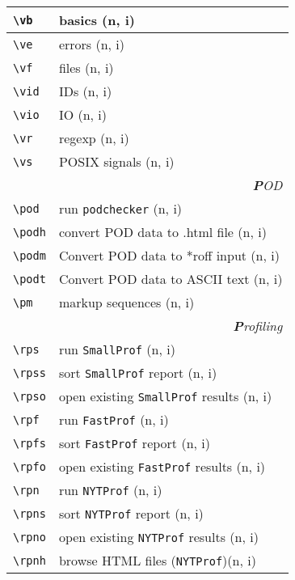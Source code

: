 \documentclass[oneside,10pt,landscape,DIV17]{scrartcl}
\begin{document}
\begin{multicols}{3}
\begin{center}
\begin{tabular}[]{|p{11mm}|p{60mm}|}
\hline \verb'\vb'   & basics \hfill (n, i)\\
\hline \verb'\ve'   & errors \hfill (n, i)\\
\hline \verb'\vf'   & files  \hfill (n, i)\\
\hline \verb'\vid'  & IDs    \hfill (n, i)\\
\hline \verb'\vio'  & IO     \hfill (n, i)\\
\hline \verb'\vr'   & regexp \hfill (n, i)\\
\hline \verb'\vs'   & POSIX signals \hfill (n, i)\\
\hline
\hline
\multicolumn{2}{|r|}{\textsl{\textbf{P}OD}}                       \\[1.0ex]
\hline \verb'\pod'    & run \verb'podchecker'           \hfill (n, i)\\
\hline \verb'\podh'   & convert POD data to .html file  \hfill (n, i)\\
\hline \verb'\podm'   & Convert POD data to *roff input \hfill (n, i)\\
\hline \verb'\podt'   & Convert POD data to ASCII text  \hfill (n, i)\\
\hline \verb'\pm'     & markup sequences                \hfill (n, i)\\
\hline
\hline
\multicolumn{2}{|r|}{\textsl{\textbf{P}rofiling}}                 \\[1.0ex]
\hline \verb'\rps'     & run \verb'SmallProf'                    \hfill (n, i)\\
\hline \verb'\rpss'    & sort \verb'SmallProf' report            \hfill (n, i)\\
\hline \verb'\rpso'    & open existing \verb'SmallProf' results  \hfill (n, i)\\
\hline
%
\hline \verb'\rpf'     & run \verb'FastProf'                    \hfill (n, i)\\
\hline \verb'\rpfs'    & sort \verb'FastProf' report            \hfill (n, i)\\
\hline \verb'\rpfo'    & open existing \verb'FastProf' results  \hfill (n, i)\\
%
\hline
\hline \verb'\rpn'     & run \verb'NYTProf'                    \hfill (n, i)\\
\hline \verb'\rpns'    & sort \verb'NYTProf' report            \hfill (n, i)\\
\hline \verb'\rpno'    & open existing \verb'NYTProf' results  \hfill (n, i)\\
\hline \verb'\rpnh'    & browse HTML files (\verb'NYTProf')\hfill (n, i)\\
\hline
\end{tabular}\\
%
%
\end{center}%
\end{multicols}%
\end{document}
